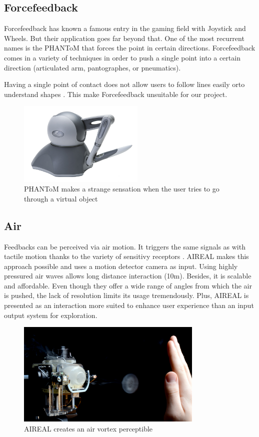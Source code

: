 \subsection{Forcefeedback}\label{forcefeedback}

Forcefeedback has known a famous entry in the gaming field with Joystick
and Wheels. But their application goes far beyond that. One of the most
recurrent names is the PHANToM \cite{massie1994phantom} that forces the point in
certain directions. Forcefeedback comes in a variety of techniques in
order to push a single point into a certain direction (articulated arm,
pantographes, or pneumatics).

Having a single point of contact does not allow users to follow lines
easily orto understand shapes \cite{yu2001haptic}. This make Forcefeedback
unsuitable for our project.

\begin{figure}[!ht]
	\centering
	\includegraphics[height=4cm]{figures/phantom.png}
	\caption{PHANToM makes a strange sensation when the user tries to go through a virtual object}
\end{figure}

\subsection{Air}\label{air}

Feedbacks can be perceived via air motion. It triggers the same signals
as with tactile motion thanks to the variety of sensitivy receptors \cite{klatzky1999zl}. AIREAL \cite{sodhi2013aireal} makes this approach possible and uses a
motion detector camera as input. Using highly pressured air waves allows
long distance interaction (10m). Besides, it is scalable and affordable.
Even though they offer a wide range of angles from which the air is
pushed, the lack of resolution limits its usage tremendously. Plus,
AIREAL is presented as an interaction more suited to enhance user
experience than an input output system for exploration.

\begin{figure}[!ht]
	\centering
	\includegraphics[height=5cm]{figures/aireal.png}
	\caption{AIREAL creates an air vortex perceptible}
\end{figure}

